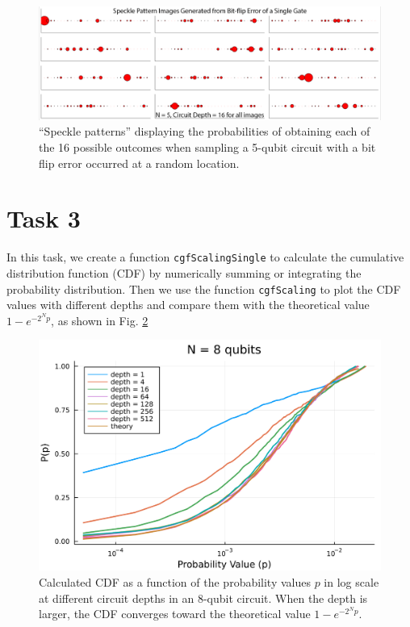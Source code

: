 \documentclass[12pt]{article}
\begin{document}
\begin{figure}[th]
	\centering
	\includegraphics [width=\linewidth] {figures/Task2}
	\caption{
		 ``Speckle patterns'' displaying the probabilities of obtaining each of the 16 possible outcomes when sampling a 5-qubit circuit with a bit flip error occurred at a random location.
	}
	\label{fig:bitflip}
\end{figure}

\section*{Task 3}

In this task, we create a function \texttt{cgfScalingSingle} to calculate the cumulative distribution function (CDF) by numerically summing or integrating the probability distribution. Then we use the function \texttt{cgfScaling} to plot the CDF values with different depths and compare them with the theoretical value $1-e^{-2^Np}$, as shown in Fig. \ref{fig:cdf}

\begin{figure}
	\centering
	\includegraphics [width=0.8\linewidth] {figures/Task3}
	\caption{
		Calculated CDF as a function of the probability values $p$ in log scale at different circuit depths in an 8-qubit circuit. When the depth is larger, the CDF converges toward the theoretical value $1- e^{-2^Np}$.
	}
	\label{fig:cdf}
\end{figure}
\end{document}
